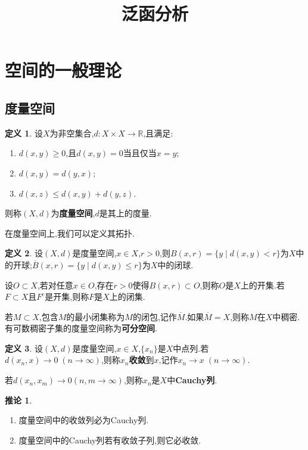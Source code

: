 \documentclass{ctexart}
\title{泛函分析}
\author{}
\date{}
\theoremstyle{definition}
\newtheorem{definition}{定义}
\newtheorem{corollary}{推论}
\theoremstyle{remark}
\begin{document}
	\maketitle
	
	\section{空间的一般理论}
	
	\subsection{度量空间}
	
	\begin{definition}
		设$X$为非空集合,$d:X\times X\to\mathbb{R}$,且满足:
		\begin{enumerate}
			\item $d(x,y)\ge 0$,且$d(x,y)=0$当且仅当$x=y$;
			\item $d(x,y)=d(y,x)$;
			\item $d(x,z)\le d(x,y)+d(y,z)$.
		\end{enumerate}
		则称$(X,d)$为\textbf{度量空间},$d$是其上的度量.
	\end{definition}
	
	在度量空间上,我们可以定义其拓扑.
	
	\begin{definition}
		设$(X,d)$是度量空间,$x\in X$,$r>0$,则$B(x,r)=\{y\mid d(x,y)<r\}$为$X$中的开球;$\overline{B}(x,r)=\{y\mid d(x,y)\le r\}$为$X$中的闭球.
		
		设$O\subset X$,若对任意$x\in O$,存在$r>0$使得$B(x,r)\subset O$,则称$O$是$X$上的开集.若$F\subset X$且$F^c$是开集,则称$F$是$X$上的闭集.
		
		若$M\subset X$,包含$M$的最小闭集称为$M$的闭包,记作$\overline{M}$.如果$\overline{M}=X$,则称$M$在$X$中稠密.有可数稠密子集的度量空间称为\textbf{可分空间}.
	\end{definition}
	
	\begin{definition}
		设$(X,d)$是度量空间,$x\in X$,$\{x_n\}$是$X$中点列.若$d(x_n,x)\to 0\;(n\to\infty)$,则称$x_n$\textbf{收敛}到$x$,记作$x_n\to x\;(n\to\infty)$.
		
		若$d(x_n,x_m)\to 0(n,m\to\infty)$,则称$x_n$是$X$中\textbf{Cauchy列}.
	\end{definition}
	\begin{corollary}
		\begin{enumerate}
			\item 度量空间中的收敛列必为Cauchy列.
			\item 度量空间中的Cauchy列若有收敛子列,则它必收敛.
		\end{enumerate}
	\end{corollary}
	
\end{document}
